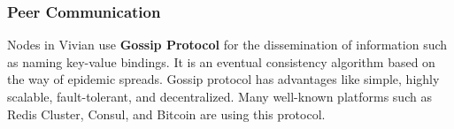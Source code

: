 \subsubsection{Peer Communication}

Nodes in Vivian use \textbf{Gossip Protocol} \cite{10.1145/41840.41841} for the dissemination of information such as naming key-value bindings. It is an eventual consistency algorithm based on the way of epidemic spreads.
Gossip protocol has advantages like simple, highly scalable, fault-tolerant, and decentralized. Many well-known platforms such as Redis Cluster, Consul, and Bitcoin are using this protocol.